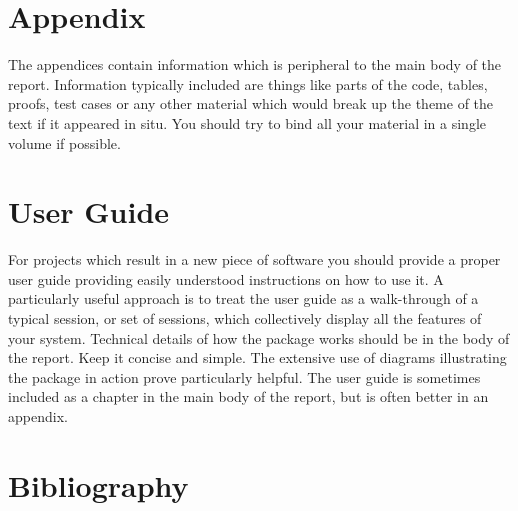 \documentclass[12pt,twoside]{article}
\begin{document}
\newpage





\section{Appendix}


The appendices contain information which is peripheral to the main body of the report. Information typically included are things like parts of the code, tables, proofs, test cases or any other material which would break up the theme of the text if it appeared in situ. You should try to bind all your material in a single volume if possible.\\

\newpage





\section{User Guide}



For projects which result in a new piece of software you should provide a proper user guide providing easily understood instructions on how to use it. A particularly useful approach is to treat the user guide as a walk-through of a typical session, or set of sessions, which collectively display all the features of your system. Technical details of how the package works should be in the body of the report. Keep it concise and simple. The extensive use of diagrams illustrating the package in action prove particularly helpful. The user guide is sometimes included as a chapter in the main body of the report, but is often better in an appendix.\\


\newpage




\section{Bibliography}





\end{document}
